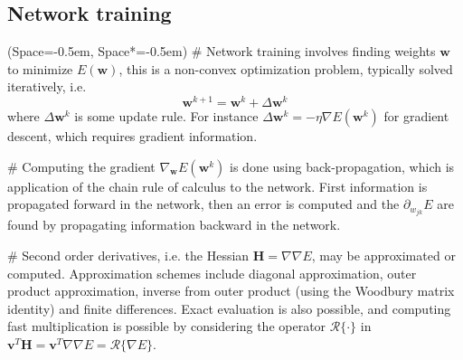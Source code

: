 \documentclass[12pt, a4paper]{article}
\newcommand{\listSpace}{-0.5em}%
\newcommand{\vect}[1]{\bm{#1}}
\begin{document}
\subsection*{Network training}
\begin{easylist}[itemize]
	\ListProperties(Space=\listSpace, Space*=\listSpace)
	# Network training involves finding weights $\vect{w}$ to minimize $E(\vect{w})$, this is a non-convex optimization problem, typically solved iteratively, i.e.
	\begin{equation*}
		\vect{w}^{k+1} = \vect{w}^{k} + \Delta  \vect{w}^{k}
	\end{equation*}
	where $\Delta  \vect{w}^{k}$ is some update rule. 
	For instance $\Delta  \vect{w}^{k} = - \eta \nabla E \left( \vect{w}^{k} \right)$ for gradient descent, which requires gradient information.
	
	# Computing the gradient $\nabla_{\vect{w}} E \left( \vect{w}^{k} \right)$ is done using back-propagation, which is application of the chain rule of calculus to the network.
	First information is propagated forward in the network, then an error is computed and the $\partial_{w_{jk}} E$ are found by propagating information backward in the network.
	
	# Second order derivatives, i.e. the Hessian $\vect{H} = \nabla \nabla E$, may be approximated or computed.
	Approximation schemes include diagonal approximation, outer product approximation, inverse from outer product (using the Woodbury matrix identity) and finite differences.
	Exact evaluation is also possible, and computing fast multiplication is possible by considering the operator $\mathcal{R}\{\cdot \}$ in $\vect{v}^T \vect{H} = \vect{v}^T \nabla \nabla E =\mathcal{R}\{ \nabla E \}$.
\end{easylist}
\end{document}

